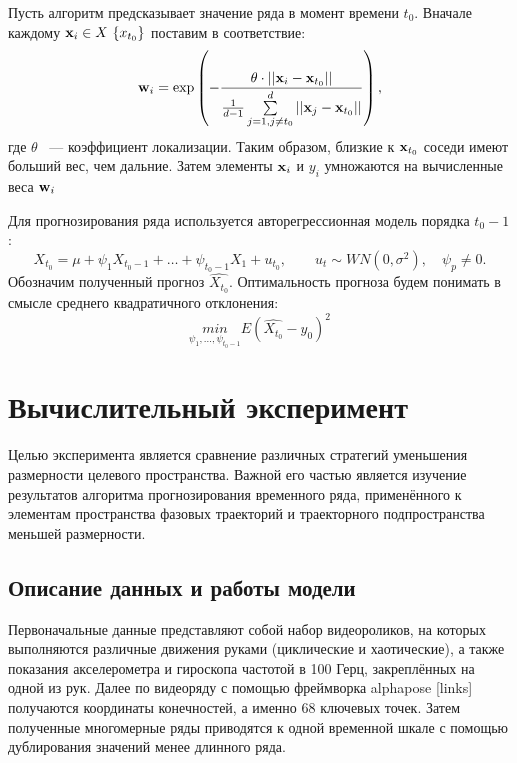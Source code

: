 \documentclass[a4paper, 12pt]{article}
\begin{document}
Пусть алгоритм предсказывает значение ряда в момент времени $t_0$. 
Вначале каждому $\mathbf{x}_i \in X \ \{ x_{t_0}\}$ поставим в соответствие: $$\mathbf{w}_i = \exp \left(-\dfrac{\theta \cdot ||\mathbf{x}_i - \mathbf{x}_{t_0}||}{\frac{1}{d-1} \sum\limits_{j=1, j \neq t_0}^d ||\mathbf{x}_j - \mathbf{x}_{t_0}||} \right), $$ 
где $\theta$ ~--- коэффициент локализации.
Таким образом, близкие к $\mathbf{x}_{t_0}$ соседи имеют больший вес, чем дальние. Затем элементы $\mathbf{x}_i$ и $y_i$ умножаются на вычисленные веса $\mathbf{w}_i$

Для прогнозирования ряда используется авторегрессионная модель порядка $t_0-1$:
$$ X_{t_0} = \mu + \psi_1 X_{t_0-1} + \ldots + \psi_{t_0-1} X_1 + u_{t_0}, \qquad u_t \sim WN(0, \sigma^2), \quad \psi_p \neq 0.$$
Обозначим полученный прогноз $\widehat{X_{t_0}}$.
Оптимальность прогноза будем понимать в смысле среднего квадратичного отклонения:
$$ \underset{\psi_1, \ldots, \psi_{t_0-1}}{min} E(\widehat{X_{t_0}} - y_0)^2$$


\section{Вычислительный эксперимент}
Целью эксперимента является сравнение различных стратегий уменьшения размерности целевого пространства. Важной его частью является изучение результатов алгоритма прогнозирования временного ряда, применённого к элементам пространства фазовых траекторий и траекторного подпространства меньшей размерности.

\subsection{Описание данных и работы модели}
Первоначальные данные представляют собой набор видеороликов, на которых выполняются различные движения руками (циклические и хаотические), а также показания акселерометра и гироскопа частотой в 100 Герц, закреплённых на одной из рук. 
Далее по видеоряду с помощью фреймворка alphapose [links] получаются координаты конечностей, а именно 68 ключевых точек.
Затем полученные многомерные ряды приводятся к одной временной шкале с помощью дублирования значений менее длинного ряда.
\end{document}
